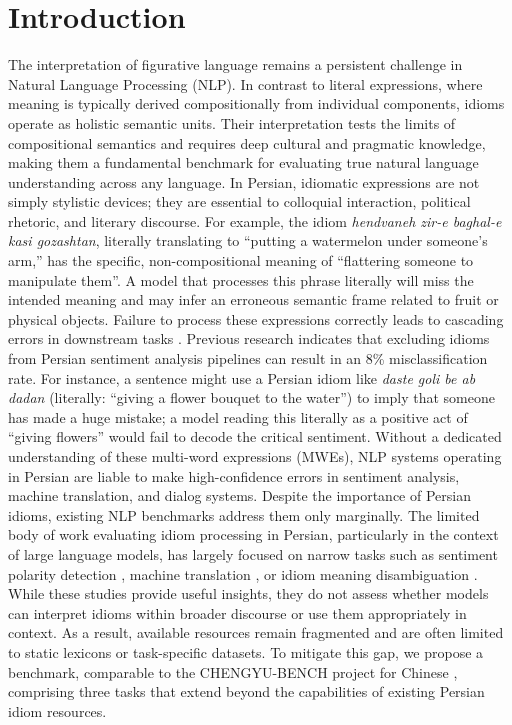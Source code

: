 \documentclass[11pt,a4paper]{article}
\begin{document}
\section{Introduction}
The interpretation of figurative language remains a persistent challenge in Natural Language Processing (NLP). In contrast to literal expressions, where meaning is typically derived compositionally from individual components, idioms operate as holistic semantic units. Their interpretation tests the limits of compositional semantics and requires deep cultural and pragmatic knowledge, making them a fundamental benchmark for evaluating true natural language understanding across any language. In Persian, idiomatic expressions are not simply stylistic devices; they are essential to colloquial interaction, political rhetoric, and literary discourse. 
For example, the idiom \textit{hendvaneh zir-e baghal-e kasi gozashtan}, literally translating to ``putting a watermelon under someone's arm,'' has the specific, non-compositional meaning of ``flattering someone to manipulate them''. A model that processes this phrase literally will miss the intended meaning and may infer an erroneous semantic frame related to fruit or physical objects. Failure to process these expressions correctly leads to cascading errors in downstream tasks \citep{fadaee-etal-2017-data, korkontzelos-etal-2013-semeval}. Previous research indicates that excluding idioms from Persian sentiment analysis pipelines can result in an 8\% misclassification rate. For instance, a sentence might use a Persian idiom like \textit{daste goli be ab dadan} (literally: ``giving a flower bouquet to the water'') to imply that someone has made a huge mistake; a model reading this literally as a positive act of ``giving flowers'' would fail to decode the critical sentiment.
Without a dedicated understanding of these multi-word expressions (MWEs), NLP systems operating in Persian are liable to make high-confidence errors in sentiment analysis, machine translation, and dialog systems.
Despite the importance of Persian idioms, existing NLP benchmarks address them only marginally. The limited body of work evaluating idiom processing in Persian, particularly in the context of large language models, has largely focused on narrow tasks such as sentiment polarity detection \cite{dashtipour2022extending}, machine translation \cite{rezaeimanesh2025largelanguagemodelspersian}, or idiom meaning disambiguation \cite{khoshtab2025multilingualidioms}. While these studies provide useful insights, they do not assess whether models can interpret idioms within broader discourse or use them appropriately in context. As a result, available resources remain fragmented and are often limited to static lexicons or task-specific datasets. To mitigate this gap, we propose a benchmark, comparable to the CHENGYU-BENCH project for Chinese \citep{fu2025chengyubench}, comprising three tasks that extend beyond the capabilities of existing Persian idiom resources.
\end{document}
